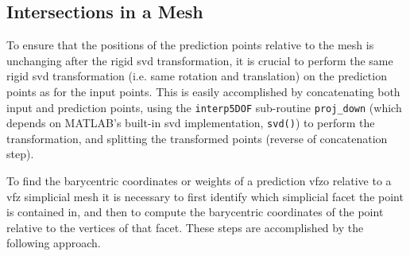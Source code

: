 \documentclass[final,twocolumn,12pt]{elsarticle}
\newcommand{\inpt}{input}
\newcommand{\outpt}{prediction}
\begin{document}
\begin{appendices}

\subsection{Intersections in a  Mesh}
\label{app:bary-int}

To ensure that the positions of the \outpt{} points relative to the mesh is unchanging after the rigid \gls{svd} transformation, it is crucial to perform the same rigid \gls{svd} transformation (i.e. same rotation and translation) on the \outpt{} points as for the \inpt{} points.
This is easily accomplished by concatenating both \inpt{} and
\outpt{} points, using the \texttt{interp5DOF} sub-routine \texttt{proj\_down} (which depends on MATLAB's built-in \gls{svd} implementation, \texttt{svd()}) to perform the transformation, and splitting the transformed points (reverse of concatenation step).

To find the barycentric coordinates or weights of a \outpt{} \gls{vfzo} relative to a \gls{vfz} simplicial mesh it is necessary to first identify which simplicial facet the point is contained in, and then to compute the barycentric coordinates of the point relative to the vertices of that facet. These steps are accomplished by the following approach.


\end{appendices}
\end{document}
